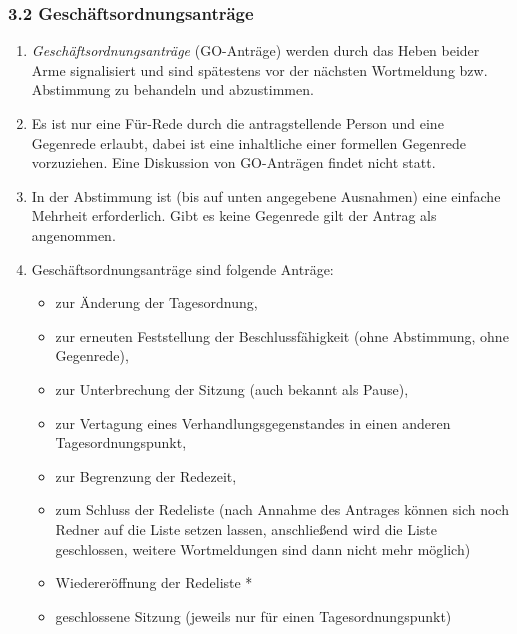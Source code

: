 \subsubsection*{3.2 Geschäftsordnungsanträge%
  \label{geschaftsordnungsantrage}%
}

\begin{enumerate}
\item \emph{Geschäftsordnungsanträge} (GO-Anträge) werden durch das Heben
beider Arme signalisiert und sind spätestens vor der nächsten Wortmeldung
bzw. Abstimmung zu behandeln und abzustimmen.

\item Es ist nur eine Für-Rede durch die antragstellende Person und eine Gegenrede
erlaubt, dabei ist eine inhaltliche einer formellen Gegenrede vorzuziehen.
Eine Diskussion von GO-Anträgen findet nicht statt.

\item In der Abstimmung ist (bis auf unten angegebene Ausnahmen) eine einfache
Mehrheit erforderlich.
Gibt es keine Gegenrede gilt der Antrag als angenommen.

\item Geschäftsordnungsanträge sind folgende Anträge:

\begin{itemize}
\item zur Änderung der Tagesordnung,

\item zur erneuten Feststellung der Beschlussfähigkeit
(ohne Abstimmung, ohne Gegenrede),

\item zur Unterbrechung der Sitzung (auch bekannt als \textquotedbl{}Pause\textquotedbl{}),

\item zur Vertagung eines Verhandlungsgegenstandes in einen anderen
Tagesordnungspunkt,

\item zur Begrenzung der Redezeit,

\item zum Schluss der Redeliste (nach Annahme des Antrages können sich
noch Redner auf die Liste setzen lassen, anschließend wird die Liste
geschlossen, weitere Wortmeldungen sind dann nicht mehr möglich)

\item Wiedereröffnung der Redeliste *

\item geschlossene Sitzung (jeweils nur für einen Tagesordnungspunkt)


\end{itemize}
\end{enumerate}
